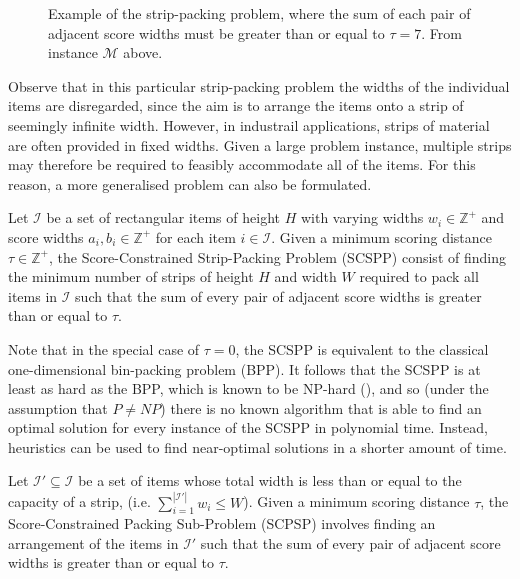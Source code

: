\documentclass[oribibl]{llncs}
\begin{document}
\begin{figure}	
	\centering
	\begin{subfigure}[h]{0.44\textwidth}
		
		\label{fig:items}\vspace{10pt}
	\end{subfigure} 
	\begin{subfigure}[h]{0.7\textwidth}
		
		\label{fig:itemsaligned}
	\end{subfigure}
	\caption{Example of the strip-packing problem, where the sum of each pair of adjacent score widths must be greater than or equal to $\tau = 7$. From instance $\mathcal{M}$ above.}
	\label{fig:items/aligned}
\end{figure}

Observe that in this particular strip-packing problem the widths of the individual items are disregarded, since the aim is to arrange the items onto a strip of seemingly infinite width. However, in industrail applications, strips of material are often provided in fixed widths. Given a large problem instance, multiple strips may therefore be required to feasibly accommodate all of the items. For this reason, a more generalised problem can also be formulated.

\begin{definition}
	Let $\mathcal{I}$ be a set of rectangular items of height $H$ with varying widths $w_i \in \mathbb{Z}^+$ and score widths $a_i, b_i \in \mathbb{Z}^+$ for each item $i \in \mathcal{I}$. Given a minimum scoring distance $\tau \in \mathbb{Z}^+$, the Score-Constrained Strip-Packing Problem (SCSPP) consist of finding the minimum number of strips of height $H$ and width $W$ required to pack all items in $\mathcal{I}$ such that the sum of every pair of adjacent score widths is greater than or equal to $\tau$. %
\end{definition}

Note that in the special case of $\tau = 0$, the SCSPP is equivalent to the classical one-dimensional bin-packing problem (BPP). It follows that the SCSPP is at least as hard as the BPP, which is known to be NP-hard (\citealp{garey1979}), and so (under the assumption that $P \neq NP$) there is no known algorithm that is able to find an optimal solution for every instance of the SCSPP in polynomial time. Instead, heuristics can be used to find near-optimal solutions in a shorter amount of time.

\begin{definition}
	\label{defn:subprob}
	Let $\mathcal{I}' \subseteq \mathcal{I}$ be a set of items whose total width is less than or equal to the capacity of a strip, (i.e. $\sum_{i=1}^{|\mathcal{I}'|}w_i \leq W$). Given a minimum scoring distance $\tau$, the Score-Constrained Packing Sub-Problem (SCPSP) involves finding an arrangement of the items in $\mathcal{I}'$ such that the sum of every pair of adjacent score widths is greater than or equal to $\tau$.
\end{definition}
\end{document}

